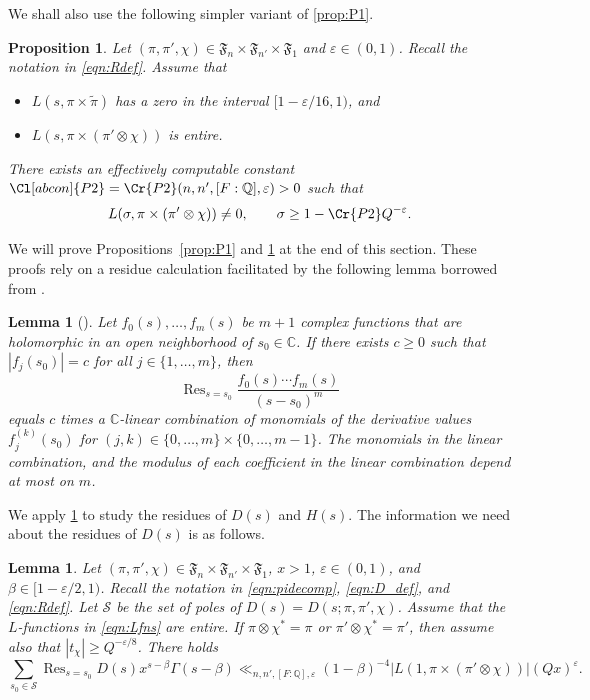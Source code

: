 \documentclass[12pt]{amsart}
\newtheorem{proposition}[theorem]{Proposition}
\newtheorem{lemma}[theorem]{Lemma}
\theoremstyle{definition}
\theoremstyle{remark}
\numberwithin{equation}{section}
\theoremstyle{plain}
\renewcommand{\tilde}{\widetilde}
\renewcommand{\epsilon}{\varepsilon}
\newcommand{\Q}{\mathbb{Q}}
\newcommand{\CC}{\mathbb{C}}
\begin{document}
We shall also use the following simpler variant of \cref{prop:P1}.

\begin{proposition}
\label{prop:P2}
Let $(\pi,\pi',\chi)\in\mathfrak{F}_n\times\mathfrak{F}_{n'}\times\mathfrak{F}_1$ and $\epsilon\in(0,1)$.  Recall the notation in \eqref{eqn:Rdef}.  Assume that
\begin{itemize}
	\item $L(s,\pi\times\tilde\pi)$ has a zero in the interval $[1-\epsilon/16,1)$, and
	\item $L(s,\pi\times(\pi'\otimes\chi))$ is entire.
\end{itemize}
There exists an effectively computable constant $\Cl[abcon]{P2}=\Cr{P2}(n,n',[F:\Q],\epsilon)>0$ such that
\begin{equation}
\label{ZFR_beta2}
L(\sigma,\pi\times(\pi'\otimes\chi))\neq 0,\qquad \sigma\geq 1-\Cr{P2}Q^{-\epsilon}.
\end{equation}
\end{proposition}

We will prove Propositions~\ref{prop:P1} and \ref{prop:P2} at the end of this section. These proofs rely on a residue calculation facilitated by the following lemma borrowed from \cite{HarcosThorner}.

\begin{lemma}[{\cite[Lemma~5.2]{HarcosThorner}}]
\label{lem:residue}
Let $f_0(s),\dotsc,f_m(s)$ be $m+1$ complex functions that are holomorphic in an open neighborhood of $s_0\in\CC$. If there exists $c\geq 0$ such that $|f_j(s_0)|=c$ for all $j\in\{1,\dotsc,m\}$, then
\[
\mathop{\mathrm{Res}}_{s=s_0}\frac{f_0(s)\dotsb f_m(s)}{(s-s_0)^m}
\]
equals $c$ times a $\CC$-linear combination of monomials of the derivative values $f_j^{(k)}(s_0)$ for $(j,k)\in\{0,\dotsc,m\}\times\{0,\dotsc,m-1\}$. The monomials in the linear combination, and the modulus of each coefficient in the linear combination depend at most on $m$.
\end{lemma}

We apply \cref{lem:residue} to study the residues of $D(s)$ and $H(s)$.  The information we need about the residues of $D(s)$ is as follows.

\begin{lemma}
\label{lem:residue_bounds}
Let $(\pi,\pi',\chi)\in\mathfrak{F}_n\times\mathfrak{F}_{n'}\times\mathfrak{F}_1$, $x>1$, $\epsilon\in(0,1)$, and $\beta\in[1-\epsilon/2,1)$. Recall the notation in  \eqref{eqn:pidecomp}, \eqref{eqn:D_def}, and \eqref{eqn:Rdef}.  Let $\mathcal{S}$ be the set of poles of $D(s)=D(s;\pi,\pi',\chi)$. Assume that the $L$-functions in \eqref{eqn:Lfns} are entire.  If $\pi\otimes\chi^*=\pi$ or $\pi'\otimes\chi^*=\pi'$, then assume also that $|t_\chi|\geq Q^{-\epsilon/8}$.  There holds
\[
\sum_{s_0\in\mathcal{S}}\mathop{\mathrm{Res}}_{s=s_0}D(s)x^{s-\beta}\Gamma(s-\beta)
\ll_{n,n',[F:\Q],\epsilon}(1-\beta)^{-4}|L(1,\pi\times(\pi'\otimes\chi))|(Qx)^{\epsilon}.	
\]
\end{lemma}
\end{document}
